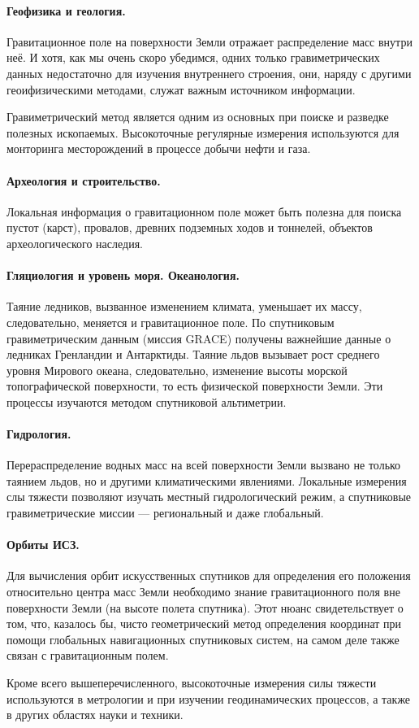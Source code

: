 \documentclass[11pt, a4paper]{article}
\theoremstyle{plain}
\theoremstyle{definition}
\theoremstyle{remark}
\begin{document}
\paragraph{Геофизика и геология.} Гравитационное поле на поверхности Земли отражает распределение масс внутри
неё. И хотя, как мы очень скоро убедимся, одних только гравиметрических данных недостаточно для изучения 
внутреннего строения, они, наряду с другими геоифизическими методами, служат важным источником
информации.\par
Гравиметрический метод является одним из основных при поиске и разведке полезных ископаемых.
Высокоточные регулярные измерения используются для монторинга месторождений в процессе добычи нефти и газа.
\paragraph{Археология и строительство.} Локальная информация о гравитационном поле может быть
полезна для поиска пустот (карст), провалов, древних подземных ходов и тоннелей, объектов археологического
наследия.
\paragraph{Гляциология и уровень моря. Океанология.} Таяние ледников, вызванное изменением климата, уменьшает их
массу, следовательно, меняется и гравитационное поле. По спутниковым гравиметрическим данным (миссия GRACE) получены
важнейшие данные о ледниках Гренландии и Антарктиды. Таяние льдов вызывает рост среднего
уровня Мирового океана, следовательно, изменение высоты морской топографической поверхности, то есть
физической поверхности Земли. Эти процессы изучаются методом спутниковой альтиметрии.
\paragraph{Гидрология.} Перераспределение водных масс на всей поверхности Земли вызвано не только
таянием льдов, но и другими климатическими явлениями. Локальные измерения слы тяжести позволяют
изучать местный гидрологический режим, а спутниковые гравиметрические миссии --- региональный и даже
глобальный. 
\paragraph{Орбиты ИСЗ.} Для вычисления орбит искусственных спутников для определения его положения относительно центра
масс Земли необходимо знание гравитационного поля вне поверхности Земли (на высоте полета спутника). Этот нюанс свидетельствует
о том, что, казалось бы, чисто геометрический метод определения координат при помощи глобальных
навигационных спутниковых систем, на самом деле также связан с гравитационным полем.

Кроме всего вышеперечисленного, высокоточные измерения силы тяжести используются в метрологии и при
изучении геодинамических процессов, а также в других областях науки и техники.

\printbibliography
\end{document}
